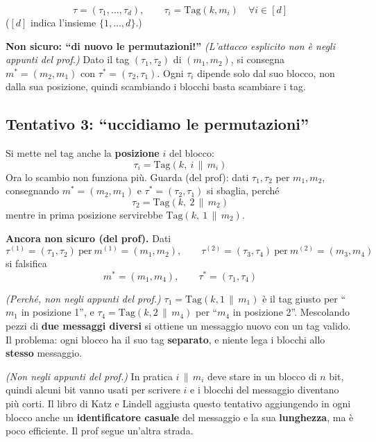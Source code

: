 \[
\tau = (\tau_1, \dots, \tau_d), \qquad \tau_i = \text{Tag}(k, m_i) \quad \forall i \in [d]
\]
(\([d]\) indica l'insieme \(\{1, \dots, d\}\).)

\textbf{Non sicuro: ``di nuovo le permutazioni!''} \emph{(L'attacco esplicito non è negli appunti del prof.)} Dato il tag \((\tau_1, \tau_2)\) di \((m_1, m_2)\), si consegna \(m^* = (m_2, m_1)\) con \(\tau^* = (\tau_2, \tau_1)\). Ogni \(\tau_i\) dipende solo dal suo blocco, non dalla sua posizione, quindi scambiando i blocchi basta scambiare i tag.

\subsection{Tentativo 3: ``uccidiamo le permutazioni''}

Si mette nel tag anche la \textbf{posizione} \(i\) del blocco:
\[
\tau_i = \text{Tag}(k,\ i \,\|\, m_i)
\]
Ora lo scambio non funziona più. Guarda (del prof): dati \(\tau_1, \tau_2\) per \(m_1, m_2\), consegnando \(m^* = (m_2, m_1)\) e \(\tau^* = (\tau_2, \tau_1)\) si sbaglia, perché
\[
\tau_2 = \text{Tag}(k,\ 2 \,\|\, m_2)
\]
mentre in prima posizione servirebbe \(\text{Tag}(k,\ 1 \,\|\, m_2)\).

\textbf{Ancora non sicuro (del prof).} Dati
\[
\tau^{(1)} = (\tau_1, \tau_2) \ \text{per} \ m^{(1)} = (m_1, m_2), \qquad \tau^{(2)} = (\tau_3, \tau_4) \ \text{per} \ m^{(2)} = (m_3, m_4)
\]
si falsifica
\[
m^* = (m_1, m_4), \qquad \tau^* = (\tau_1, \tau_4)
\]

\emph{(Perché, non negli appunti del prof.)} \(\tau_1 = \text{Tag}(k, 1 \,\|\, m_1)\) è il tag giusto per ``\(m_1\) in posizione 1'', e \(\tau_4 = \text{Tag}(k, 2 \,\|\, m_4)\) per ``\(m_4\) in posizione 2''. Mescolando pezzi di \textbf{due messaggi diversi} si ottiene un messaggio nuovo con un tag valido. Il problema: ogni blocco ha il suo tag \textbf{separato}, e niente lega i blocchi allo \textbf{stesso} messaggio.

\begin{nota}
\emph{(Non negli appunti del prof.)} In pratica \(i \,\|\, m_i\) deve stare in un blocco di \(n\) bit, quindi alcuni bit vanno usati per scrivere \(i\) e i blocchi del messaggio diventano più corti. Il libro di Katz e Lindell aggiusta questo tentativo aggiungendo in ogni blocco anche un \textbf{identificatore casuale} del messaggio e la sua \textbf{lunghezza}, ma è poco efficiente. Il prof segue un'altra strada.
\end{nota}


